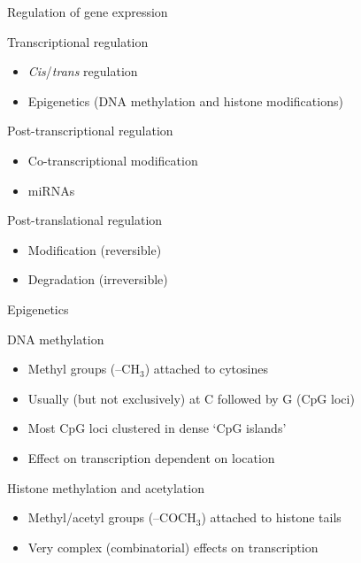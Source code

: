 \begin{frame}{Regulation of gene expression}
    \begin{block}{Transcriptional regulation}
        \begin{itemize}
            \item \textit{Cis}/\textit{trans} regulation
            \item Epigenetics (DNA methylation and histone modifications)
        \end{itemize}
    \end{block}
    \vfill
    \begin{block}{Post\hyp{}transcriptional regulation}
        \begin{itemize}
            \item Co\hyp{}transcriptional modification
            \item miRNAs
        \end{itemize}
    \end{block}
    \vfill
    \begin{block}{Post\hyp{}translational regulation}
        \begin{itemize}
            \item Modification (reversible)
            \item Degradation (irreversible)
        \end{itemize}
    \end{block}
\end{frame}

\begin{frame}{Epigenetics}
    \begin{block}{DNA methylation}
        \begin{itemize}
            \item Methyl groups (--CH$_{3}$) attached to cytosines
            \item Usually (but not exclusively) at C followed by G
                  (\alert{CpG loci})
            \item Most CpG loci clustered in dense `CpG islands'
            \item Effect on transcription dependent on location
        \end{itemize}
    \end{block}
    \vfill
    \begin{block}{Histone methylation and acetylation}
        \begin{itemize}
            \item Methyl/acetyl groups (--COCH$_{3}$) attached to histone
                  tails
            \item Very complex (combinatorial) effects on transcription
        \end{itemize}
    \end{block}
\end{frame}

